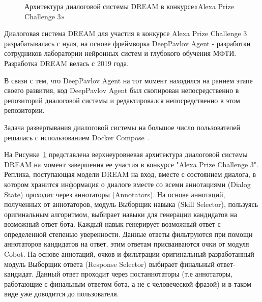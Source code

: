 \begin{figure}[ht]
  \caption{Архитектура диалоговой системы {DREAM} в конкурсе«Alexa Prize Challenge 3»}\label{fig:Alexa1}
\end{figure}


Диалоговая система {DREAM} для участия в конкурсе Alexa Prize Challenge 3 разрабатывалась с нуля, на основе фреймворка DeepPavlov Agent -  разработки сотрудников лаборатории нейронных систем и глубокого обучения МФТИ. Разработка {DREAM} велась с 2019 года.

В связи с тем, что DeepPavlov Agent на тот момент находился на раннем этапе своего развития, код DeepPavlov Agent был скопирован непосредственно в репозиторий диалоговой системы и редактировался непосредственно в этом репозитории.

Задача развертывания диалоговой системы на большое число пользователей решалась с использованием Docker Compose~\cite{na_website_ndk}.

На Рисунке~\ref{fig:Alexa1} представлена верхнеуровневая архитектура диалоговой системы {DREAM} на момент завершения ее участия в конкурсе "Alexa Prize Challenge 3". Реплика, поступающая модели {DREAM} на вход, вместе с состоянием диалога, в котором хранится информация о диалоге вместе со всеми аннотациями (Dialog State) проходит через аннотаторы (Annotators). На основе аннотаций, полученных от аннотаторов, модуль Выборщик навыка (Skill Selector), пользуясь оригинальным алгоритмом, выбирает навыки для генерации кандидатов на возможный ответ бота. Каждый навык генерирует возможный ответ с определенной степенью уверенности. Данные ответы фильтруются при помощи аннотаторов кандидатов на ответ, этим ответам присваиваются очки от модуля Cobot. На основе аннотаций, очков и фильтрации оригинальный разработанный модуль Выборщик ответа (Response Selector) выбирает финальный ответ-кандидат. Данный ответ проходит через постаннотаторы (т.е аннотаторы, работающие с финальным ответом бота, а не с человеческой фразой) и в таком виде уже доводится до пользователя.

